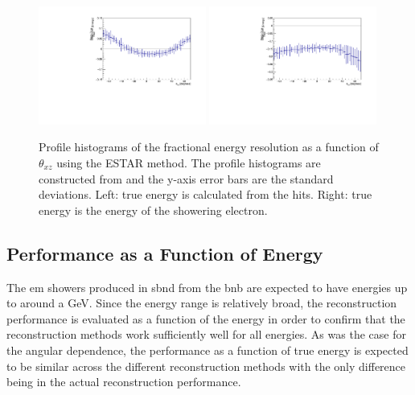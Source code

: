 \begin{figure}[h!]
    \centering
    \includegraphics[width = 0.49\textwidth]{figures-chap4/frac_res_vs_thetaXZ_cheating_electron_vertex_plane2_cut_ESTAR_profile.pdf}
    \includegraphics[width = 0.49\textwidth]{figures-chap4/frac_res_vs_thetaXZ_cheating_electron_vertex_plane2_cut_showeringE_ESTAR_profile.pdf}
    \caption[Profile histograms of the fractional energy resolution as a function of $\theta_{xz}$.]{Profile histograms of the fractional energy resolution as a function of $\theta_{xz}$ using the ESTAR method. The profile histograms are constructed from  and the y-axis error bars are the standard deviations.  Left: true energy is calculated from the hits. Right: true energy is the energy of the showering electron.}
    \label{fig:reconstruction_as_a_function_of_angle_profile}
\end{figure}

\subsection{Performance as a Function of Energy}
The \gls{em} showers produced in \gls{sbnd} from the \gls{bnb} are expected to have energies up to around a GeV. Since the energy range is relatively broad, the reconstruction performance is evaluated as a function of the energy in order to confirm that the reconstruction methods work sufficiently well for all energies. As was the case for the angular dependence, the performance as a function of true energy is expected to be similar across the different reconstruction methods with the only difference being in the actual reconstruction performance. 


